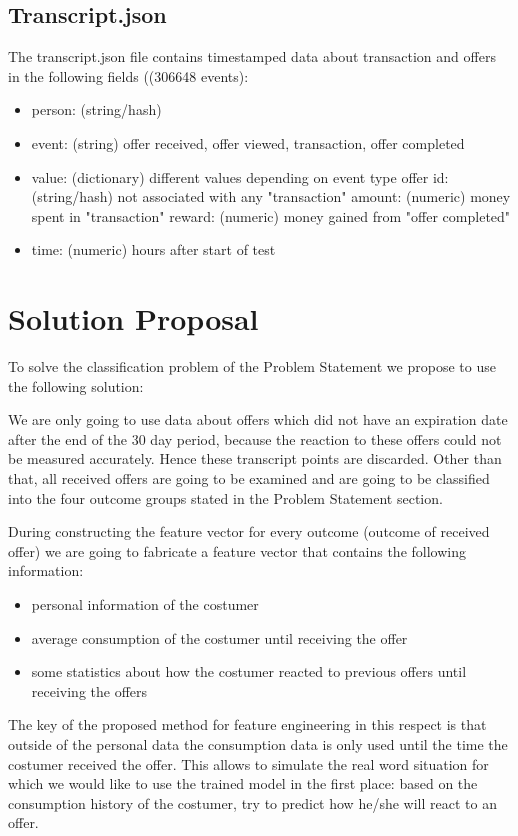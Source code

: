 \documentclass[10pt,oneside,a4paper]{report}
\begin{document}
\subsection*{Transcript.json}
The transcript.json file contains timestamped data about transaction and offers in the following fields ((306648 events):
\begin{itemize}
	\item person: (string/hash)
	\item event: (string) offer received, offer viewed, transaction, offer completed
	\item value: (dictionary) different values depending on event type
		\subitem offer id: (string/hash) not associated with any "transaction"
		\subitem amount: (numeric) money spent in "transaction"
		\subitem reward: (numeric) money gained from "offer completed"
	\item time: (numeric) hours after start of test
\end{itemize}

\section*{Solution Proposal}

To solve the classification problem of the Problem Statement we propose to use the following solution:

We are only going to use data about offers which did not have an expiration date after the end of the 30 day period, because the reaction to these offers could not be measured accurately. Hence these transcript points are discarded. Other than that, all received offers are going to be examined and are going to be classified into the four outcome groups stated in the Problem Statement section. 

During constructing the feature vector for every outcome (outcome of received offer) we are going to fabricate a feature vector that contains the following information:
\begin{itemize}
	\item personal information of the costumer
	\item average consumption of the costumer until receiving the offer
	\item some statistics about how the costumer reacted to previous offers until receiving the offers
\end{itemize}

The key of the proposed method for feature engineering in this respect is that outside of the personal data the consumption data is only used until the time the costumer received the offer. This allows to simulate the real word situation for which we would like to use the trained model in the first place: based on the consumption history of the costumer, try to predict how he/she will react to an offer. 
\end{document}
